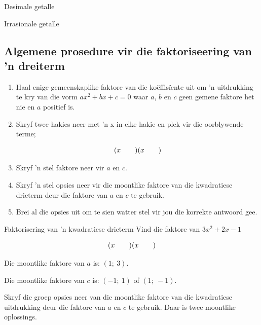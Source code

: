 \begin{Aktiwiteit}{Desimale getalle}
\begin{aktiwiteit}{Irrasionale getalle}
\subsection*{Algemene prosedure vir die faktoriseering van 'n dreiterm}

\begin{enumerate}[itemsep=5pt, label=\textbf{\arabic*}. ] 
\item Haal enige gemeenskaplike faktore van die koëffisïente uit om ’n uitdrukking te kry van die vorm $a{x}^{2}+bx+c=0$ waar $a$, $b$ en $c$ geen gemene faktore het nie en $a$ positief is.
\item Skryf twee hakies neer met ’n x in elke hakie en plek vir die oorblywende terme;

\begin{equation*}
(x\phantom{\rule{2.em}{0ex}})(x\phantom{\rule{2.em}{0ex}})
\end{equation*}

\item Skryf ’n stel faktore neer vir $a$ en $c$.
\item Skryf ’n stel opsies neer vir die moontlike faktore van die kwadratiese drieterm deur die faktore van $a$ en $c$ te gebruik.
\item Brei al die opsies uit om te sien watter stel vir jou die korrekte antwoord gee.
\end{enumerate}




\begin{wex}
{ 
Faktorisering van ’n kwadratiese drieterm
}
{
Vind die faktore van $3{x}^{2}+2x-1$ 
} 
{
\begin{equation*}
(x\phantom{\rule{2.em}{0ex}})(x\phantom{\rule{2.em}{0ex}})
\end{equation*}

Die moontlike faktore van $a$ is: $(1;~3)$.\par
Die moontlike faktore van $c$ is: $(-1;~1)$ of $(1;~-1)$.\par 
Skryf die groep opsies neer van die moontlike faktore van die kwadratiese uitdrukking deur die faktore van $a$ en $c$ te gebruik.
Daar is twee moontlike oplossings.\par 

}
\end{wex}
\end{aktiwiteit}
\end{Aktiwiteit}
